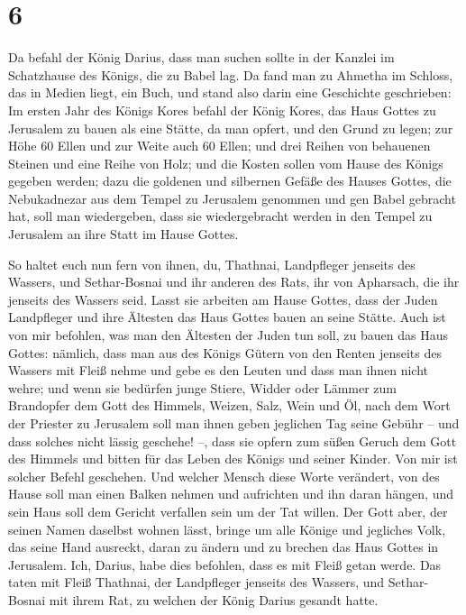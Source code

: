 \hypertarget{section-5}{%
\section{6}\label{section-5}}

 Da befahl der König Darius, dass man suchen sollte in der
Kanzlei im Schatzhause des Königs, die zu Babel lag.  Da
fand man zu Ahmetha im Schloss, das in Medien liegt, ein Buch, und stand
also darin eine Geschichte geschrieben:  Im ersten Jahr
des Königs Kores befahl der König Kores, das Haus Gottes zu Jerusalem zu
bauen als eine Stätte, da man opfert, und den Grund zu legen; zur Höhe
60 Ellen und zur Weite auch 60 Ellen;  und drei Reihen von
behauenen Steinen und eine Reihe von Holz; und die Kosten sollen vom
Hause des Königs gegeben werden;  dazu die goldenen und
silbernen Gefäße des Hauses Gottes, die Nebukadnezar aus dem Tempel zu
Jerusalem genommen und gen Babel gebracht hat, soll man wiedergeben,
dass sie wiedergebracht werden in den Tempel zu Jerusalem an ihre Statt
im Hause Gottes.

 So haltet euch nun fern von ihnen, du, Thathnai,
Landpfleger jenseits des Wassers, und Sethar-Bosnai und ihr anderen des
Rats, ihr von Apharsach, die ihr jenseits des Wassers seid.
 Lasst sie arbeiten am Hause Gottes, dass der Juden
Landpfleger und ihre Ältesten das Haus Gottes bauen an seine Stätte.
 Auch ist von mir befohlen, was man den Ältesten der Juden
tun soll, zu bauen das Haus Gottes: nämlich, dass man aus des Königs
Gütern von den Renten jenseits des Wassers mit Fleiß nehme und gebe es
den Leuten und dass man ihnen nicht wehre;  und wenn sie
bedürfen junge Stiere, Widder oder Lämmer zum Brandopfer dem Gott des
Himmels, Weizen, Salz, Wein und Öl, nach dem Wort der Priester zu
Jerusalem soll man ihnen geben jeglichen Tag seine Gebühr -- und dass
solches nicht lässig geschehe! --,  dass sie opfern zum
süßen Geruch dem Gott des Himmels und bitten für das Leben des Königs
und seiner Kinder.  Von mir ist solcher Befehl geschehen.
Und welcher Mensch diese Worte verändert, von des Hause soll man einen
Balken nehmen und aufrichten und ihn daran hängen, und sein Haus soll
dem Gericht verfallen sein um der Tat willen.  Der Gott
aber, der seinen Namen daselbst wohnen lässt, bringe um alle Könige und
jegliches Volk, das seine Hand ausreckt, daran zu ändern und zu brechen
das Haus Gottes in Jerusalem. Ich, Darius, habe dies befohlen, dass es
mit Fleiß getan werde.  Das taten mit Fleiß Thathnai, der
Landpfleger jenseits des Wassers, und Sethar-Bosnai mit ihrem Rat, zu
welchen der König Darius gesandt hatte.

